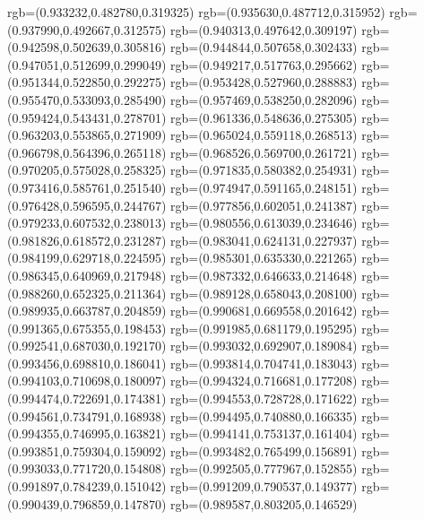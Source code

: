 {{{            rgb=(0.933232,0.482780,0.319325)
            rgb=(0.935630,0.487712,0.315952)
            rgb=(0.937990,0.492667,0.312575)
            rgb=(0.940313,0.497642,0.309197)
            rgb=(0.942598,0.502639,0.305816)
            rgb=(0.944844,0.507658,0.302433)
            rgb=(0.947051,0.512699,0.299049)
            rgb=(0.949217,0.517763,0.295662)
            rgb=(0.951344,0.522850,0.292275)
            rgb=(0.953428,0.527960,0.288883)
            rgb=(0.955470,0.533093,0.285490)
            rgb=(0.957469,0.538250,0.282096)
            rgb=(0.959424,0.543431,0.278701)
            rgb=(0.961336,0.548636,0.275305)
            rgb=(0.963203,0.553865,0.271909)
            rgb=(0.965024,0.559118,0.268513)
            rgb=(0.966798,0.564396,0.265118)
            rgb=(0.968526,0.569700,0.261721)
            rgb=(0.970205,0.575028,0.258325)
            rgb=(0.971835,0.580382,0.254931)
            rgb=(0.973416,0.585761,0.251540)
            rgb=(0.974947,0.591165,0.248151)
            rgb=(0.976428,0.596595,0.244767)
            rgb=(0.977856,0.602051,0.241387)
            rgb=(0.979233,0.607532,0.238013)
            rgb=(0.980556,0.613039,0.234646)
            rgb=(0.981826,0.618572,0.231287)
            rgb=(0.983041,0.624131,0.227937)
            rgb=(0.984199,0.629718,0.224595)
            rgb=(0.985301,0.635330,0.221265)
            rgb=(0.986345,0.640969,0.217948)
            rgb=(0.987332,0.646633,0.214648)
            rgb=(0.988260,0.652325,0.211364)
            rgb=(0.989128,0.658043,0.208100)
            rgb=(0.989935,0.663787,0.204859)
            rgb=(0.990681,0.669558,0.201642)
            rgb=(0.991365,0.675355,0.198453)
            rgb=(0.991985,0.681179,0.195295)
            rgb=(0.992541,0.687030,0.192170)
            rgb=(0.993032,0.692907,0.189084)
            rgb=(0.993456,0.698810,0.186041)
            rgb=(0.993814,0.704741,0.183043)
            rgb=(0.994103,0.710698,0.180097)
            rgb=(0.994324,0.716681,0.177208)
            rgb=(0.994474,0.722691,0.174381)
            rgb=(0.994553,0.728728,0.171622)
            rgb=(0.994561,0.734791,0.168938)
            rgb=(0.994495,0.740880,0.166335)
            rgb=(0.994355,0.746995,0.163821)
            rgb=(0.994141,0.753137,0.161404)
            rgb=(0.993851,0.759304,0.159092)
            rgb=(0.993482,0.765499,0.156891)
            rgb=(0.993033,0.771720,0.154808)
            rgb=(0.992505,0.777967,0.152855)
            rgb=(0.991897,0.784239,0.151042)
            rgb=(0.991209,0.790537,0.149377)
            rgb=(0.990439,0.796859,0.147870)
            rgb=(0.989587,0.803205,0.146529)
}}}
